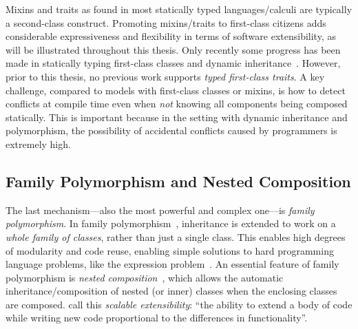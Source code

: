 Mixins and traits as found in most statically typed languages/calculi are
typically a second-class construct. Promoting mixins/traits to first-class
citizens adds considerable expressiveness and flexibility in terms of software
extensibility, as will be illustrated throughout this thesis. Only recently some
progress has been made in statically typing first-class classes and dynamic
inheritance~\citep{DBLP:conf/oopsla/TakikawaSDTF12,DBLP:conf/ecoop/LeeASP15}.
However, prior to this thesis, no previous work supports \emph{typed first-class traits}.
A key challenge, compared to models with first-class
classes or mixins, is how to detect conflicts at compile time even when \emph{not}
knowing all components being composed statically. This is important because in
the setting with dynamic inheritance and polymorphism, the possibility of
accidental conflicts caused by programmers is extremely high.



\subsection{Family Polymorphism and Nested Composition}

The last mechanism---also the most powerful and complex one---is \emph{family
  polymorphism}. In family polymorphism~\citep{Ernst_2001}, inheritance is
extended to work on a \emph{whole family of classes}, rather than just a single
class. This enables high degrees of modularity and code reuse, enabling simple
solutions to hard programming language problems, like the expression
problem~\citep{wadler1998expression}. An essential feature of family
polymorphism is \emph{nested composition}~\citep{Corradi_2012,
  ErnstVirtual,Nystrom_2004}, which allows the automatic inheritance/composition
of nested (or inner) classes when the enclosing classes are composed.
\citet{Nystrom_2004} call this \emph{scalable extensibility}: ``the ability to
extend a body of code while writing new code proportional to the differences in
functionality''.

